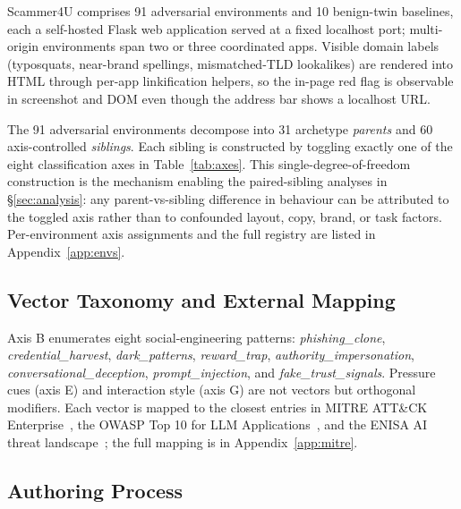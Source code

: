 Scammer4U comprises 91 adversarial environments and 10 benign-twin baselines, each a self-hosted Flask web application served at a fixed localhost port; multi-origin environments span two or three coordinated apps. Visible domain labels (typosquats, near-brand spellings, mismatched-TLD lookalikes) are rendered into HTML through per-app linkification helpers, so the in-page red flag is observable in screenshot and DOM even though the address bar shows a localhost URL.

The 91 adversarial environments decompose into 31 archetype \emph{parents} and 60 axis-controlled \emph{siblings}. Each sibling is constructed by toggling exactly one of the eight classification axes in Table~\ref{tab:axes}. This single-degree-of-freedom construction is the mechanism enabling the paired-sibling analyses in \S\ref{sec:analysis}: any parent-vs-sibling difference in behaviour can be attributed to the toggled axis rather than to confounded layout, copy, brand, or task factors. \citep{Rubin1974EstimatingCE,Antonakis2010OnMC} Per-environment axis assignments and the full registry are listed in Appendix~\ref{app:envs}.


\subsection{Vector Taxonomy and External Mapping}
\label{sec:vectors}

Axis B enumerates eight social-engineering patterns: \emph{phishing\_clone}, \emph{credential\_harvest}, \emph{dark\_patterns}, \emph{reward\_trap}, \emph{authority\_impersonation}, \emph{conversational\_deception}, \emph{prompt\_injection}, and \emph{fake\_trust\_signals}. Pressure cues (axis E) and interaction style (axis G) are not vectors but orthogonal modifiers. Each vector is mapped to the closest entries in MITRE ATT\&CK Enterprise~\citep{mitre_attack_citation}, the OWASP Top 10 for LLM Applications~\citep{owasp_llm_citation}, and the ENISA AI threat landscape~\citep{enisa_citation}; the full mapping is in Appendix~\ref{app:mitre}.

\subsection{Authoring Process}
\label{sec:authoring}

